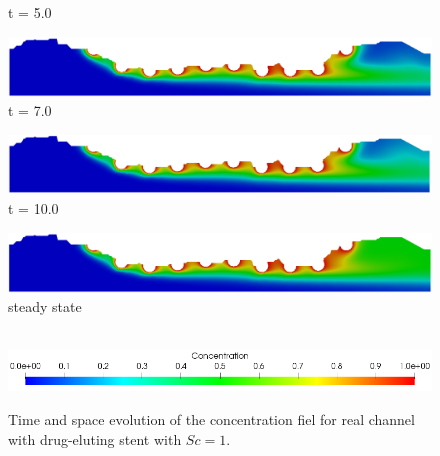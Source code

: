 \begin{figure}[H]
\begin{minipage}{.50\linewidth}
      t = 5.0
     \end{minipage}%
     \begin{minipage}{.50\linewidth}
      \centering
      \includegraphics[scale=0.18]{./02_chaps/cap_solution/figure/conc1_RealStrut6.png}\\
      t = 7.0
     \end{minipage}
     \begin{minipage}{.50\linewidth}
     \medskip
      \centering
      \includegraphics[scale=0.18]{./02_chaps/cap_solution/figure/conc1_RealStrut7.png}\\
      t = 10.0
     \end{minipage}%
     \begin{minipage}{.50\linewidth}
     \medskip
      \centering
      \includegraphics[scale=0.18]{./02_chaps/cap_solution/figure/conc1_RealStrut8.png}\\
      steady state
     \end{minipage}\\[10pt]
      \centering
      \includegraphics[scale=0.5]{./02_chaps/cap_solution/figure/conc1_RealStrutScale.png}\\
     \medskip
     \caption{
Time and space evolution of the concentration fiel for real channel with drug-eluting stent with $Sc=1$.}
     \label{conc field real stent sc 1}
\end{figure}



